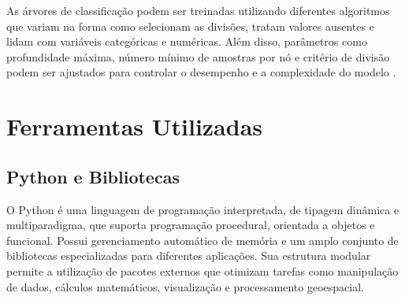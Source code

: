 As árvores de classificação podem ser treinadas utilizando diferentes algoritmos que variam na forma como selecionam as divisões, tratam valores ausentes e lidam com variáveis categóricas e numéricas. Além disso, parâmetros como profundidade máxima, número mínimo de amostras por nó e critério de divisão podem ser ajustados para controlar o desempenho e a complexidade do modelo \cite{quinlan1986induction}.

\section{Ferramentas Utilizadas}





\subsection{Python e Bibliotecas}

O Python\cite{python} é uma linguagem de programação interpretada, de tipagem dinâmica e multiparadigma, que suporta programação procedural, orientada a objetos e funcional. Possui gerenciamento automático de memória e um amplo conjunto de bibliotecas especializadas para diferentes aplicações. Sua estrutura modular permite a utilização de pacotes externos que otimizam tarefas como manipulação de dados, cálculos matemáticos, visualização e processamento geoespacial.

